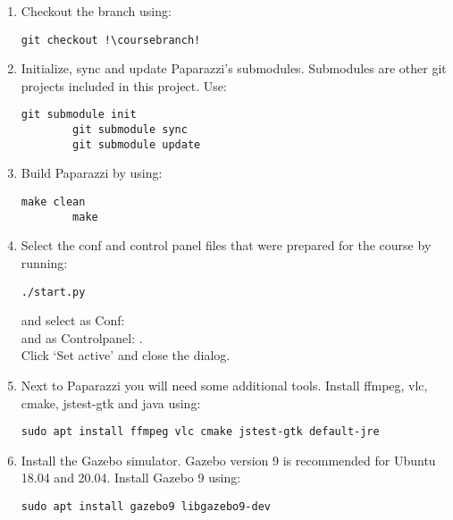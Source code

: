 \begin{enumerate}
	Before you can commit you should setup git correctly:
	\begin{lstlisting}[style=Bash]
		git config --global user.name !\hl{your\_name}!
		git config --global user.email !\hl{your\_email@host.com}!
	\end{lstlisting}

	

	\item Checkout the \coursebranch{} branch using:
	\begin{lstlisting}[style=Bash]
		git checkout !\coursebranch!
	\end{lstlisting}
	
	\item Initialize, sync and update Paparazzi's submodules. Submodules are other git projects included in this project. Use:
	\begin{lstlisting}[style=Bash]
		git submodule init
		git submodule sync
		git submodule update
	\end{lstlisting}
	
	\item Build Paparazzi by using:
	\begin{lstlisting}[style=Bash]
		make clean
		make
	\end{lstlisting}
	
	\item{Select the conf and control panel files that were prepared for the course by running:
	\begin{lstlisting}[style=Bash]
		./start.py
	\end{lstlisting}
	and select as Conf: \\
	and as Controlpanel: .\\
	Click `Set active' and close the dialog.}
	
	\item Next to Paparazzi you will need some additional tools. Install ffmpeg, vlc, cmake, jstest-gtk and java using:
	\begin{lstlisting}[style=Bash]
		sudo apt install ffmpeg vlc cmake jstest-gtk default-jre
	\end{lstlisting}
	\item Install the Gazebo simulator. Gazebo version 9 is recommended for Ubuntu 18.04 and 20.04. Install Gazebo 9 using:
	\begin{lstlisting}[style=Bash]
		sudo apt install gazebo9 libgazebo9-dev
	\end{lstlisting}
	

\end{enumerate}
